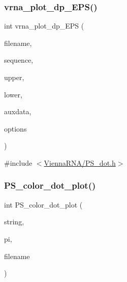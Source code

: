 \subsubsection{\texorpdfstring{vrna\+\_\+plot\+\_\+dp\+\_\+\+E\+P\+S()}{vrna\_plot\_dp\_EPS()}}
{\footnotesize\ttfamily int vrna\+\_\+plot\+\_\+dp\+\_\+\+E\+PS (\begin{DoxyParamCaption}\item[{const char $\ast$}]{filename,  }\item[{const char $\ast$}]{sequence,  }\item[{\mbox{\hyperlink{group__struct__utils_gab9ac98ab55ded9fb90043b024b915aca}{vrna\+\_\+ep\+\_\+t}} $\ast$}]{upper,  }\item[{\mbox{\hyperlink{group__struct__utils_gab9ac98ab55ded9fb90043b024b915aca}{vrna\+\_\+ep\+\_\+t}} $\ast$}]{lower,  }\item[{\mbox{\hyperlink{group__plotting__utils_structvrna__dotplot__auxdata__t}{vrna\+\_\+dotplot\+\_\+auxdata\+\_\+t}} $\ast$}]{auxdata,  }\item[{unsigned int}]{options }\end{DoxyParamCaption})}



{\ttfamily \#include $<$\mbox{\hyperlink{_p_s__dot_8h}{Vienna\+R\+N\+A/\+P\+S\+\_\+dot.\+h}}$>$}

\mbox{\label{group__plotting__utils_ga2f6294599b0fbe8338bec6918c3b1ba7}} 
\subsubsection{\texorpdfstring{P\+S\+\_\+color\+\_\+dot\+\_\+plot()}{PS\_color\_dot\_plot()}}
{\footnotesize\ttfamily int P\+S\+\_\+color\+\_\+dot\+\_\+plot (\begin{DoxyParamCaption}\item[{char $\ast$}]{string,  }\item[{\mbox{\hyperlink{group__data__structures_ga8412f116a2eb07b59ade9e14ca7c5ef1}{cpair}} $\ast$}]{pi,  }\item[{char $\ast$}]{filename }\end{DoxyParamCaption})}



